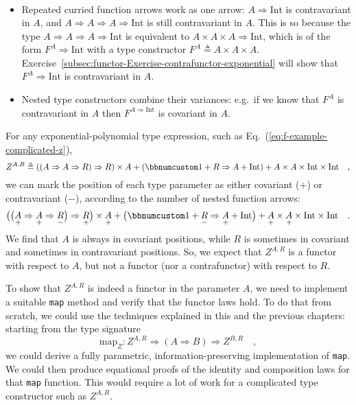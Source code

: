 \begin{itemize}
\begin{align*}
\end{align*}
\item Repeated curried function arrows work as one arrow: $A\Rightarrow\text{Int}$
is contravariant in $A$, and $A\Rightarrow A\Rightarrow A\Rightarrow\text{Int}$
is still contravariant in $A$. This is so because the type $A\Rightarrow A\Rightarrow A\Rightarrow\text{Int}$
is equivalent to $A\times A\times A\Rightarrow\text{Int}$, which
is of the form $F^{A}\Rightarrow\text{Int}$ with a type constructor
$F^{A}\triangleq A\times A\times A$. Exercise~\ref{subsec:functor-Exercise-contrafunctor-exponential}
will show that $F^{A}\Rightarrow\text{Int}$ is contravariant in $A$.
\item Nested type constructors combine their variances: e.g.~if we know
that $F^{A}$ is contravariant in $A$ then $F^{A\Rightarrow\text{Int}}$
is covariant in $A$.
\end{itemize}
For any exponential-polynomial type expression, such as Eq.~(\ref{eq:f-example-complicated-z}),
\[
Z^{A,R}\triangleq\left(\left(A\Rightarrow A\Rightarrow R\right)\Rightarrow R\right)\times A+\left(\bbnum 1+R\Rightarrow A+\text{Int}\right)+A\times A\times\text{Int}\times\text{Int}\quad,
\]
we can mark the position of each type parameter as either covariant
($+$) or contravariant ($-$), according to the number of nested
function arrows:
\[
\big(\big(\underset{+}{A}\Rightarrow\underset{+}{A}\Rightarrow\underset{-}{R}\big)\Rightarrow\underset{+}{R}\big)\times\underset{+}{A}+\big(\bbnum 1+\underset{-}{R}\Rightarrow\underset{+}{A}+\text{Int}\big)+\underset{+}{A}\times\underset{+}{A}\times\text{Int}\times\text{Int}\quad.
\]
We find that $A$ is always in covariant positions, while $R$ is
sometimes in covariant and sometimes in contravariant positions. So,
we expect that $Z^{A,R}$ is a functor with respect to $A$, but not
a functor (nor a contrafunctor) with respect to $R$.

To show that $Z^{A,R}$ is indeed a functor in the parameter $A$,
we need to implement a suitable \lstinline!map! method and verify
that the functor laws hold. To do that from scratch, we could use
the techniques explained in this and the previous chapters: starting
from the type signature 
\[
\text{map}_{Z}:Z^{A,R}\Rightarrow\left(A\Rightarrow B\right)\Rightarrow Z^{B,R}\quad,
\]
we could derive a fully parametric, information-preserving implementation
of \lstinline!map!. We could then produce equational proofs of the
identity and composition laws for that \lstinline!map! function.
This would require a lot of work for a complicated type constructor
such as $Z^{A,R}$.


